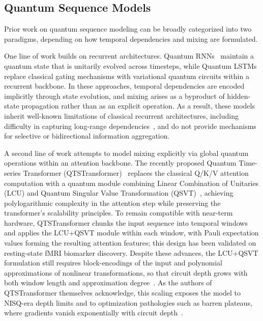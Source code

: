 \documentclass[conference]{IEEEtran}
\begin{document}
\subsection{Quantum Sequence Models}

Prior work on quantum sequence modeling can be broadly categorized into two paradigms, depending on how temporal dependencies and mixing are formulated.

One line of work builds on recurrent architectures. Quantum RNNs~\cite{Bausch2020QRNN, Li2023QRNN} maintain a quantum state that is unitarily evolved across timesteps, while Quantum LSTMs~\cite{Chen2022QLSTM} replace classical gating mechanisms with variational quantum circuits within a recurrent backbone. In these approaches, temporal dependencies are encoded implicitly through state evolution, and mixing arises as a byproduct of hidden-state propagation rather than as an explicit operation. As a result, these models inherit well-known limitations of classical recurrent architectures, including difficulty in capturing long-range dependencies~\cite{Hochreiter1997RNN}, and do not provide mechanisms for selective or bidirectional information aggregation.

A second line of work attempts to model mixing explicitly via global quantum operations within an attention backbone. The recently proposed Quantum Time-series Transformer (QTSTransformer)~\cite{Park2025QTSTransformer} replaces the classical Q/K/V attention computation with a quantum module combining Linear Combination of Unitaries (LCU) and Quantum Singular Value Transformation (QSVT)~\cite{Childs2017lineareq, Gilyen2019QSTT}, achieving polylogarithmic complexity in the attention step while preserving the transformer's scalability principles. To remain compatible with near-term hardware, QTSTransformer chunks the input sequence into temporal windows and applies the LCU+QSVT module within each window, with Pauli expectation values forming the resulting attention features; this design has been validated on resting-state fMRI biomarker discovery. Despite these advances, the LCU+QSVT formulation still requires block-encodings of the input and polynomial approximations of nonlinear transformations, so that circuit depth grows with both window length and approximation degree~\cite{Tomal2025QAttentionNLP, Kuznetsov2026QAttentionLLM}. As the authors of QTSTransformer themselves acknowledge, this scaling exposes the model to NISQ-era depth limits and to optimization pathologies such as barren plateaus, where gradients vanish exponentially with circuit depth~\cite{McClean2018, Larocca2025, Cerezo2021}.
\end{document}
